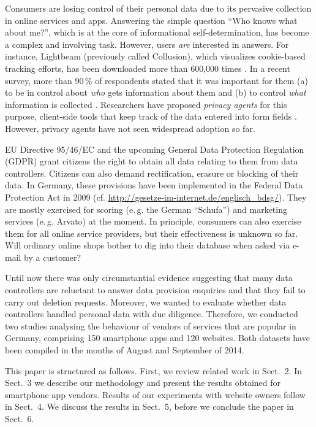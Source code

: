 \documentclass{llncs}
\begin{document}
Consumers are losing control of their personal data due to its pervasive collection in online services and apps.
Answering the simple question ``Who knows what about me?'', which is at the core of informational self-determination, has become a complex and involving task. However, users \emph{are} interested in answers. For instance, Lightbeam (previously called Collusion), which visualizes cookie-based tracking efforts, has been downloaded more than 600,000 times \cite{Collusion}. In a recent survey, more than 90\,\% of respondents stated that it was important for them (a) to be in control about \emph{who} gets information about them and (b) to control \emph{what} information is collected \cite{Pew15b}. Researchers have proposed \emph{privacy agents} for this purpose, client-side tools that keep track of the data entered into form fields \cite{KolterNP10}. However, privacy agents have not seen widespread adoption so far.

EU Directive 95/46/EC \cite{EUDirective} and the upcoming General Data Protection Regulation (GDPR) grant citizens the right to obtain all data relating to them from data controllers. Citizens can also demand rectification, erasure or blocking of their data. In Germany, these provisions have been implemented in the Federal Data Protection Act in 2009 (cf. \url{http://gesetze-im-internet.de/englisch_bdsg/}). They are mostly exercised for scoring (e.\,g. the German ``Schufa'') and marketing services (e.\,g. Arvato) at the moment. In principle, consumers can also exercise them for all online service providers, but their effectiveness is unknown so far. Will ordinary online shops bother to dig into their database when asked via e-mail by a customer?

Until now there was only circumstantial evidence suggesting that many data controllers are reluctant to answer data provision enquiries and that they fail to carry out deletion requests. Moreover, we wanted to evaluate whether data controllers handled personal data with due diligence. Therefore, we conducted two studies analysing the behaviour of vendors of services that are popular in Germany, comprising 150 smartphone apps and 120 websites. Both datasets have been compiled in the months of August and September of 2014.

This paper is structured as follows. First, we review related work in Sect.~2. In Sect.~3 we describe our methodology and present the results obtained for smartphone app vendors. Results of our experiments with website owners follow in Sect.~4. We discuss the results in Sect.~5, before we conclude the paper in Sect.~6.
\end{document}
